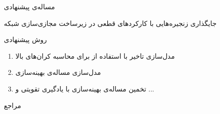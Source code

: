 \documentclass[dvipsnames]{beamer}
\makeatletter
\newcommand{\RTList}{\raggedleft\rightskip\@totalleftmargin}
\makeatother
\begin{document}
\begin{persian}
	\begin{frame}{مساله‌ی پیشنهادی}
		\begin{block}{}
			\centering
			جایگذاری زنجیره‌هایی با کارکردهای قطعی در زیرساخت مجازی‌سازی شبکه
		\end{block}
	\end{frame}

	\begin{frame}{روش‌ پیشنهادی}
		\begin{enumerate}\RTList{}
				\justifying%
				\item مدل‌سازی تاخیر با استفاده از  برای محاسبه کران‌های بالا
				\item مدل‌سازی مساله‌ی بهینه‌سازی
				\item تخمین مساله‌ی بهینه‌سازی با یادگیری تقویتی و ...
		\end{enumerate}
	\end{frame}

	\begin{frame}[allowframebreaks]{مراجع}
		\begin{latin}
		\printbibliography[title=مراجع]
		\end{latin}
	\end{frame}

\end{persian}
\end{document}
